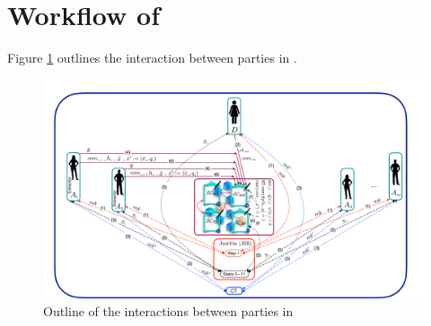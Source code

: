 


\section{Workflow of \withRew}\label{sec::Workflow-of-withRew}


Figure \ref{fig:parties-interactions-in-ANE} outlines the interaction between parties in \withRew.

\begin{figure}[htp]
    \centering
    \includegraphics[width=12cm]{Diag-2.pdf}
    \caption{Outline of the interactions between parties in \withRew}\label{fig:parties-interactions-in-ANE}
\end{figure}
